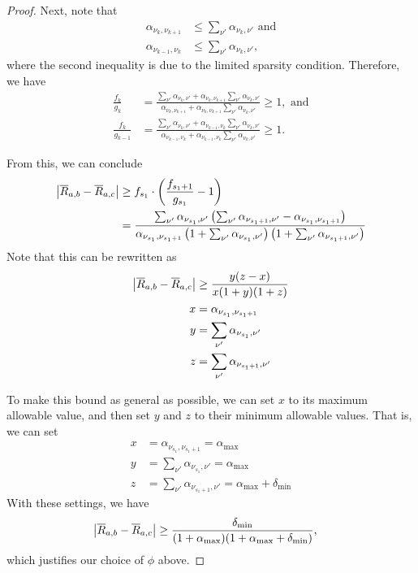 \documentclass{article}
\theoremstyle{definition}
\newcommand{\deltaMin}{\delta_{\text{min}}}
\newcommand{\alphaMax}{\alpha_{\text{max}}}
\begin{document}
\begin{proof}
Next, note that
\begin{align*}
\alpha_{\nu_k,\nu_{k+1}} &\leq \sum_{\nu'} \alpha_{\nu_k,\nu'} \text{ and} \\
\alpha_{\nu_{k-1},\nu_{k}} &\leq \sum_{\nu'} \alpha_{\nu_k,\nu'},
\end{align*}
where the second inequality is due to the limited sparsity condition.
Therefore, we have
\begin{align*}
\frac{f_k}{g_k}
&=
\frac{ \sum_{\nu'} \alpha_{\nu_k,\nu'} + \alpha_{\nu_k,\nu_{k+1}} \sum_{\nu'} \alpha_{\nu_k,\nu'} }
     { \alpha_{\nu_k,\nu_{k+1}} + \alpha_{\nu_k,\nu_{k+1}} \sum_{\nu'} \alpha_{\nu_k,\nu'} }
\geq 1, \text{ and}
\\
\frac{f_k}{g_{k-1}}
&=
\frac{ \sum_{\nu'} \alpha_{\nu_k,\nu'} + \alpha_{\nu_{k-1},\nu_{k}} \sum_{\nu'} \alpha_{\nu_k,\nu'} }
     { \alpha_{\nu_{k-1},\nu_{k}} + \alpha_{\nu_{k-1},\nu_{k}} \sum_{\nu'} \alpha_{\nu_k,\nu'} }
\geq 1.
\end{align*}

From this, we can conclude
\begin{align*}
\left\lvert \overline{R}_{a,b} - \overline{R}_{a,c} \right\rvert
&\geq
f_{s_1}
\cdot
\left(
  \frac{f_{s_1 + 1}}{g_{s_1}}
  - 1
\right)
\\
&=
\frac{ \sum_{\nu'} \alpha_{\nu_{s_1},\nu'}
       \left(
         \sum_{\nu'} \alpha_{\nu_{s_1+1},\nu'}
         -
         \alpha_{\nu_{s_1},\nu_{s_1+1}}
       \right)
     }
     {
       \alpha_{\nu_{s_1},\nu_{s_1+1}}
       \left( 1 + \sum_{\nu'} \alpha_{\nu_{s_1},\nu'} \right)
       \left( 1 + \sum_{\nu'} \alpha_{\nu_{s_1+1},\nu'} \right)
     }
\end{align*}
Note that this can be rewritten as
\begin{align*}
\left\lvert \overline{R}_{a,b} - \overline{R}_{a,c} \right\rvert
&\geq \frac{y(z-x)}{x(1+y)(1+z)} \\
x &= \alpha_{\nu_{s_1},\nu_{s_1+1}} \\
y &= \sum_{\nu'} \alpha_{\nu_{s_1},\nu'}\\
z &= \sum_{\nu'} \alpha_{\nu_{s_1+1},\nu'}
\end{align*}

To make this bound as general as possible, we can set $x$ to its maximum allowable value, and then set $y$ and $z$ to their minimum allowable values.
That is, we can set
\begin{align*}
x &= \alpha_{\nu_{s_1},\nu_{s_1+1}} = \alphaMax \\
y &= \sum_{\nu'} \alpha_{\nu_{s_1},\nu'} = \alphaMax \\
z &= \sum_{\nu'} \alpha_{\nu_{s_1+1},\nu'} = \alphaMax + \deltaMin
\end{align*}
With these settings, we have
\begin{align*}
\left\lvert \Rbar_{a,b} - \Rbar_{a,c} \right\rvert
&\geq \frac{\deltaMin}{(1 + \alphaMax) (1 + \alphaMax + \deltaMin)},
\end{align*}
which justifies our choice of $\phi$ above.
\end{proof}
\end{document}
